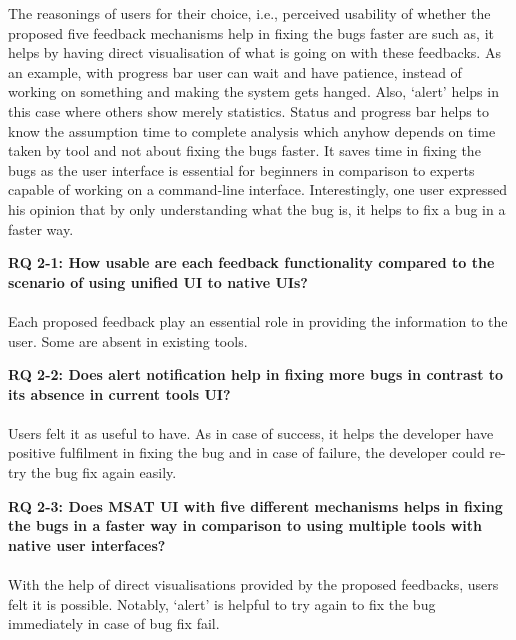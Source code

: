 The reasonings of users for their choice, i.e., perceived usability of whether the proposed five feedback mechanisms help in fixing the bugs faster are such as, it helps by having direct visualisation of what is going on with these feedbacks. As an example, with progress bar user can wait and have patience, instead of working on something and making the system gets hanged. Also, ‘alert’ helps in this case where others show merely statistics. Status and progress bar helps to know the assumption time to complete analysis which anyhow depends on time taken by tool and not about fixing the bugs faster. It saves time in fixing the bugs as the user interface is essential for beginners in comparison to experts capable of working on a command-line interface. Interestingly, one user expressed his opinion that by only understanding what the bug is, it helps to fix a bug in a faster way. \\

\begin{myboxi}{{\textbf{RQ 2-1: How usable are each feedback functionality compared to the scenario of using unified UI to native UIs?}}}
	\\ \\ Each proposed feedback play an essential role in providing the information to the user. Some are absent in existing tools.
\end{myboxi}

\begin{myboxi}{{\textbf{RQ 2-2: Does alert notification help in fixing more bugs in contrast to its absence in current tools UI?}}}
	\\ \\ Users felt it as useful to have. As in case of success, it helps the developer have positive fulfilment in fixing the bug and in case of failure, the developer could re-try the bug fix again easily. \\
\end{myboxi}

\begin{myboxi}{{\textbf{RQ 2-3: Does MSAT UI with five different mechanisms helps in fixing the bugs in a faster way in comparison to using multiple tools with native user interfaces?}}}
	\\ \\ With the help of direct visualisations provided by the proposed feedbacks, users felt it is possible. Notably, ‘alert’ is helpful to try again to fix the bug immediately in case of bug fix fail. \\
\end{myboxi}

